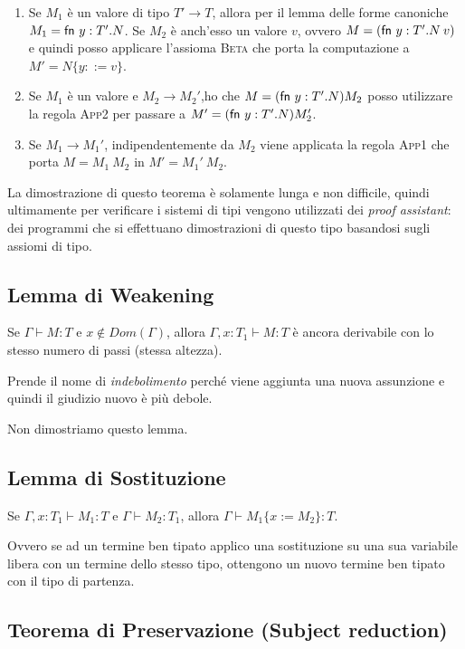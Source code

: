 \begin{itemize}
	\begin{enumerate}[a]
		\item Se $M_1$ è un valore di tipo $T' \rightarrow T$, allora per il lemma delle forme canoniche $M_1 = \fn y:T'.N$. Se $M_2$ è anch'esso un valore $v$, ovvero $M = (\fn y:T'.N \: v)$ e quindi posso applicare l'assioma \textsc{Beta} che porta la computazione a $M' = N\{y ::= v\}$.
		\item Se $M_1$ è un valore e $M_2 \rightarrow M_2'$,ho che $M = (\fn y:T'.N) M_2$ posso utilizzare la regola \textsc{App2} per passare a $M' = (\fn y:T'.N) M_2'$.
		\item Se $M_1 \rightarrow M_1'$, indipendentemente da $M_2$ viene applicata la regola \textsc{App1} che porta $M = M_1 \: M_2 $ in $M' = M_1' \: M_2$. 
	\end{enumerate}
\end{itemize}

\noindent La dimostrazione di questo teorema è solamente lunga e non difficile, quindi ultimamente per verificare i sistemi di tipi vengono utilizzati dei \textit{proof assistant}: dei programmi che si effettuano dimostrazioni di questo tipo basandosi sugli assiomi di tipo.

\subsection{Lemma di Weakening}

Se $\Gamma \vdash M : T $ e $x \notin Dom(\Gamma)$, allora $\Gamma, x : T_1 \vdash M : T$ è ancora derivabile con lo stesso numero di passi (stessa altezza).

Prende il nome di \textit{indebolimento} perché viene aggiunta una nuova assunzione e quindi il giudizio nuovo è più debole.

Non dimostriamo questo lemma.

\subsection{Lemma di Sostituzione}

Se $\Gamma, x: T_1 \vdash M_1 : T$ e $\Gamma \vdash M_2 : T_1$, allora $\Gamma \vdash M_1\{x := M_2\}: T$.

Ovvero se ad un termine ben tipato applico una sostituzione su una sua variabile libera con un termine dello stesso tipo, ottengono un nuovo termine ben tipato con il tipo di partenza. 

\subsection{Teorema di Preservazione (Subject reduction)}

